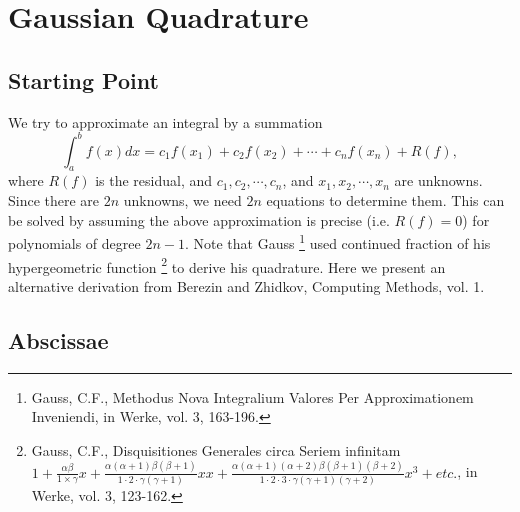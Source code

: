 \chapter{Gaussian Quadrature}


\section{Starting Point}

We try to approximate an integral by a summation
\begin{equation}
  \int_a^b f(x) dx = c_1 f(x_1) + c_2 f(x_2) + \cdots + c_n f(x_n) + R(f),
\end{equation}
where $R(f)$ is the residual, and $c_1,c_2,\cdots,c_n$, and $x_1,x_2,\cdots,x_n$
are unknowns. Since there are $2n$ unknowns, we need $2n$ equations to
determine them. This can be solved by assuming the above approximation 
is precise (i.e. $R(f)=0$) for polynomials of degree $2n-1$.
Note that Gauss 
\footnote{Gauss, C.F., Methodus Nova Integralium Valores Per Approximationem
Inveniendi, in Werke, vol. 3, 163-196.}
used continued fraction of his hypergeometric function 
\footnote{Gauss, C.F., Disquisitiones Generales circa Seriem infinitam
$1+\frac{\alpha\beta}{1\times\gamma}x
+\frac{\alpha(\alpha+1)\beta(\beta+1)}{1\cdot2\cdot\gamma(\gamma+1)}xx
+\frac{\alpha(\alpha+1)(\alpha+2)\beta(\beta+1)(\beta+2)}
      {1\cdot2\cdot3\cdot\gamma(\gamma+1)(\gamma+2)}x^3 + etc.$,
in Werke, vol. 3, 123-162.}
to derive his quadrature. 
Here we present an alternative derivation from Berezin and Zhidkov,
Computing Methods, vol. 1.


\section{Abscissae}

